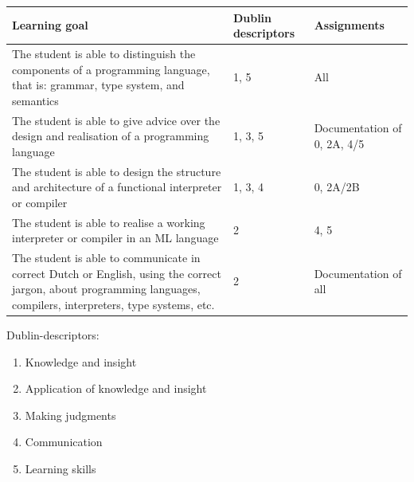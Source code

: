 \documentclass[a4paper, 10pt]{article}
\begin{document}
	\begin{tabular}{|p{7cm}|p{3.5cm}|p{5cm}|}
		\hline
		Learning goal & Dublin descriptors & Assignments \\
		\hline
		The student is able to distinguish the components of a programming language, that is: grammar, type system, and semantics 
			& 1, 5
			& All \\
		\hline
        The student is able to give advice over the design and realisation of a programming language 
        	& 1, 3, 5 
        	& Documentation of 0, 2A, 4/5 \\
		\hline
		The student is able to design the structure and architecture of a functional interpreter or compiler 
			& 1, 3, 4
        	& 0, 2A/2B \\
		\hline
		The student is able to realise a working interpreter or compiler in an ML language 
			& 2 
			& 4, 5 \\
		\hline
		The student is able to communicate in correct Dutch or English, using the correct jargon, about programming languages, compilers, interpreters, type systems, etc. 
			& 2 
			& Documentation of all  \\
		\hline
	\end{tabular}
	
	\vspace{1cm}

	Dublin-descriptors:
	\begin{enumerate}
		\item Knowledge and insight
		\item Application of knowledge and insight
		\item Making judgments
		\item Communication
		\item Learning skills
	\end{enumerate}
\newpage


\printindex
\end{document}
